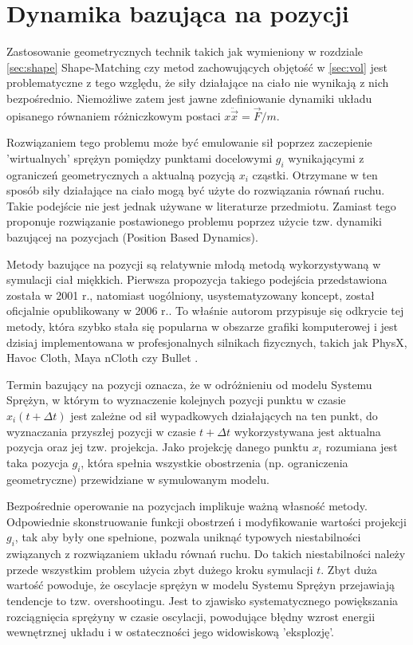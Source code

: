 \section{Dynamika bazująca na pozycji}
\label{sec:dyn}

Zastosowanie geometrycznych technik takich jak wymieniony w rozdziale
\ref{sec:shape} Shape-Matching czy metod zachowujących objętość w \ref{sec:vol}
jest problematyczne z tego względu, że siły działające na ciało nie wynikają
z nich bezpośrednio. Niemożliwe zatem jest jawne zdefiniowanie dynamiki układu
opisanego równaniem różniczkowym postaci $x\ddot{\vec{x}} = \vec{F}/m$.

Rozwiązaniem tego problemu może być emulowanie sił poprzez zaczepienie
'wirtualnych' sprężyn pomiędzy punktami docelowymi $g_i$ wynikającymi z ograniczeń
geometrycznych a aktualną pozycją $x_i$ cząstki. Otrzymane w ten sposób
siły działające na ciało mogą być użyte do rozwiązania równań ruchu.
Takie podejście nie jest jednak używane w literaturze przedmiotu. Zamiast tego
\cite{pbdyn} proponuje rozwiązanie postawionego problemu poprzez użycie
tzw. dynamiki bazującej na pozycjach (Position Based Dynamics).

Metody bazujące na pozycji są relatywnie młodą metodą wykorzystywaną w symulacji
ciał miękkich. Pierwsza propozycja takiego podejścia przedstawiona została w
2001 r.\cite{jak}, natomiast uogólniony, usystematyzowany koncept, został oficjalnie
opublikowany w 2006 r.\cite{pbdyn}. To właśnie autorom \cite{pbdyn} przypisuje
się odkrycie tej metody, która szybko stała się popularna w obszarze grafiki
komputerowej i jest dzisiaj implementowana w profesjonalnych silnikach fizycznych,
takich jak PhysX, Havoc Cloth, Maya nCloth czy Bullet \cite{Liu:2013:FSM}.

Termin bazujący na pozycji oznacza, że w odróżnieniu od modelu Systemu Sprężyn,
	   w którym to wyznaczenie kolejnych pozycji punktu w czasie $x_i(t +
			   \Delta t)$ jest zależne od sił wypadkowych działających na ten
	   punkt, do wyznaczania przyszłej pozycji w czasie $t + \Delta t$
	   wykorzystywana jest aktualna pozycja oraz jej tzw. projekcja. Jako
	   projekcję danego punktu $x_i$ rozumiana jest taka pozycja $g_i$, która
	   spełnia wszystkie obostrzenia (np. ograniczenia geometryczne)
	przewidziane w symulowanym modelu.

Bezpośrednie operowanie na pozycjach implikuje ważną własność metody. Odpowiednie
skonstruowanie funkcji obostrzeń i modyfikowanie wartości projekcji $g_i$, tak
aby były one spełnione, pozwala uniknąć typowych niestabilności związanych z
rozwiązaniem układu równań ruchu. Do takich niestabilności należy przede
wszystkim problem użycia zbyt dużego kroku symulacji $t$. Zbyt
duża wartość powoduje, że oscylacje sprężyn w modelu Systemu Sprężyn przejawiają
tendencje to tzw. overshootingu. Jest to zjawisko systematycznego powiększania rozciągnięcia
sprężyny w czasie oscylacji, powodujące błędny wzrost energii wewnętrznej układu i w
ostateczności jego widowiskową 'eksplozję'.


